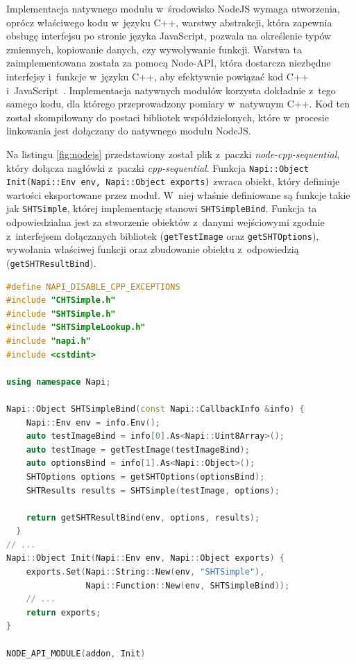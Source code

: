 Implementacja natywnego modułu w~środowisko NodeJS wymaga utworzenia, oprócz właściwego kodu w~języku C++, warstwy abstrakcji, która zapewnia obsługę interfejsu po stronie języka JavaScript, pozwala na określenie typów zmiennych, kopiowanie danych, czy wywoływanie funkcji. Warstwa ta zaimplementowana została za pomocą Node-API, która dostarcza niezbędne interfejsy i~funkcje w~języku C++, aby efektywnie powiązać kod C++ i~JavaScript~\cite{napi}. Implementacja natywnych modułów korzysta dokładnie z~tego samego kodu, dla którego przeprowadzony pomiary w~natywnym C++. Kod ten został skompilowany do postaci bibliotek współdzielonych, które w~procesie linkowania jest dołączany do natywnego modułu NodeJS. 

Na listingu \ref{fig:nodejs} przedstawiony został plik z~paczki \textit{node-cpp-sequential}, który dołącza nagłówki z~paczki \textit{cpp-sequential}. Funkcja \lstinline{Napi::Object Init(Napi::Env env, Napi::Object exports)} zwraca obiekt, który definiuje wartości eksportowane przez moduł. W~niej właśnie definiowane są funkcje takie jak \lstinline{SHTSimple}, której implementację stanowi \lstinline{SHTSimpleBind}. Funkcja ta odpowiedzialna jest za stworzenie obiektów z~danymi wejściowymi zgodnie z~interfejsem dołączanych bibliotek (\lstinline{getTestImage} oraz \lstinline{getSHTOptions}), wywołania właściwej funkcji oraz zbudowanie obiektu z~odpowiedzią (\lstinline{getSHTResultBind}).

\begin{lstlisting}[language=C++, float=h, caption=Plik powiązania kodu C++ z~JavaScript, label=lst:cpp-js]
#define NAPI_DISABLE_CPP_EXCEPTIONS
#include "CHTSimple.h"
#include "SHTSimple.h"
#include "SHTSimpleLookup.h"
#include "napi.h"
#include <cstdint>

using namespace Napi;
    
Napi::Object SHTSimpleBind(const Napi::CallbackInfo &info) {
    Napi::Env env = info.Env();
    auto testImageBind = info[0].As<Napi::Uint8Array>();
    auto testImage = getTestImage(testImageBind);
    auto optionsBind = info[1].As<Napi::Object>();
    SHTOptions options = getSHTOptions(optionsBind);
    SHTResults results = SHTSimple(testImage, options);
  
    return getSHTResultBind(env, options, results);
  }
// ...
Napi::Object Init(Napi::Env env, Napi::Object exports) {
    exports.Set(Napi::String::New(env, "SHTSimple"),
                Napi::Function::New(env, SHTSimpleBind));
    // ...
    return exports;
}
  
NODE_API_MODULE(addon, Init)
\end{lstlisting}

